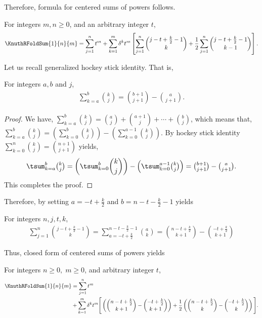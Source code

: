 Therefore, formula for centered sums of powers follows.
\begin{proposition}
  \label{prop:centered-decomposition-of-power-sums}
  For integers $m,n \geq 0$, and an arbitrary integer $t$,
  \begin{align*}
    \KnuthRFoldSum{1}{n}{m} = \sum_{j=1}^{n} t^m
    + \sum_{k=1}^{m} \delta^{k} t^m
    \left [
      \sum_{j=1}^{n} \binom{j-t+\frac{k}{2}-1}{k}
      + \frac{1}{2}
      \sum_{j=1}^n \binom{j-t+\frac{k}{2}-1}{k-1}
    \right ].
  \end{align*}
\end{proposition}
Let us recall generalized hockey stick identity. That is,
\begin{proposition}
  \label{prop:generalized-hockey-stick-identity}
  For integers $a,b$ and $j$,
  \begin{align*}
    \sum_{k=a}^{b} \binom{k}{j} = \binom{b+1}{j+1} - \binom{a}{j+1}.
  \end{align*}
  \begin{proof}
    We have,
    $\sum_{k=a}^{b} \binom{k}{j} = \binom{a}{j} + \binom{a+1}{j} + \cdots + \binom{b}{j}$,
    which means that,
    $\sum_{k=a}^{b} \binom{k}{j} =
    \left( \sum_{k=0}^{b} \binom{k}{j} \right) - \left( \sum_{k=0}^{a-1} \binom{k}{j} \right)$.
    By hockey stick identity $\sum_{k=0}^{n} \binom{k}{j} = \binom{n+1}{j+1}$ yields,
    \begin{align*}
      \tsum_{k=a}^{b} \tbinom{k}{j}
      = \left( \tsum_{k=0}^{b} \binom{k}{j} \right) - \left( \tsum_{k=0}^{a-1} \tbinom{k}{j} \right)
      = \tbinom{b+1}{j+1} - \tbinom{a}{j+1}.
    \end{align*}
    This completes the proof.
  \end{proof}
\end{proposition}
Therefore, by setting $a=-t+\frac{k}{2}$ and $b=n-t-\frac{k}{2}-1$ yields
\begin{proposition}
  \label{prop:centered-hockey-stick-identity}
  For integers $n, j, t, k$,
  \begin{align*}
    \sum_{j=1}^{n} \binom{j-t+\frac{k}{2}-1}{k}
    = \sum_{a=-t+\frac{k}{2}}^{n-t-\frac{k}{2}-1} \binom{a}{k}
    = \binom{n-t+\frac{k}{2}}{k+1} - \binom{-t+\frac{k}{2}}{k+1}
  \end{align*}
\end{proposition}
Thus, closed form of centered sums of powers yields
\begin{theorem}
  \label{theorem:closed-form-of-centered-sums-of-powers}
  For integers $n\geq 0, \; m \geq 0$, and arbitrary integer $t$,
  \begin{align*}
    \KnuthRFoldSum{1}{n}{m}
    &= \sum_{j=1}^{n} t^m \\
    &+ \sum_{k=1}^{m} \delta^{k} t^m
    \Bigg [
      \left( \binom{n-t+\frac{k}{2}}{k+1} - \binom{-t+\frac{k}{2}}{k+1} \right)
      + \frac{1}{2}
      \left( \binom{n-t+\frac{k}{2}}{k} - \binom{-t+\frac{k}{2}}{k} \right)
    \Bigg ].
  \end{align*}
\end{theorem}
